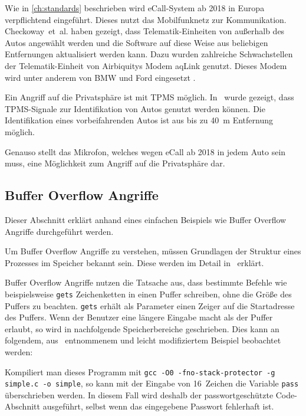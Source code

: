 Wie in \cref{ch:standards} beschrieben wird eCall-System ab 2018 in Europa
verpflichtend eingeführt. Dieses nutzt das Mobilfunknetz zur Kommunikation.
Checkoway~et~al. haben gezeigt, dass Telematik-Einheiten von außerhalb des
Autos angewählt werden und die Software auf diese Weise aus beliebigen
Entfernungen aktualisiert werden kann. Dazu wurden zahlreiche Schwachstellen
der Telematik-Einheit von Airbiquitys Modem aqLink genutzt. Dieses Modem wird
unter anderem von BMW und Ford eingesetzt \cite{AirbiquityBMW,AirbiquityFord}.

Ein Angriff auf die Privatsphäre ist mit TPMS möglich. In~\cite{Rouf2010} wurde
gezeigt, dass TPMS-Signale zur Identifikation von Autos genutzt werden können.
Die Identifikation eines vorbeifahrenden Autos ist aus bis zu \SI{40}{\meter}
Entfernung möglich.

Genauso stellt das Mikrofon, welches wegen eCall ab 2018 in jedem Auto sein
muss, eine Möglichkeit zum Angriff auf die Privatsphäre dar.


\subsection{Buffer Overflow Angriffe}\label{sec:Buffer-Overflow}
Dieser Abschnitt erklärt anhand eines einfachen Beispiels wie Buffer Overflow
Angriffe durchgeführt werden.

Um Buffer Overflow Angriffe zu verstehen, müssen Grundlagen der Struktur eines
Prozesses im Speicher bekannt sein. Diese werden im Detail
in~\cite{Silberschatz2005} erklärt.

Buffer Overflow Angriffe nutzen die Tatsache aus, dass bestimmte Befehle wie
beispielsweise \verb+gets+ Zeichenketten in einen Puffer schreiben, ohne die
Größe des Puffers zu beachten. \verb+gets+ erhält als Parameter einen Zeiger
auf die Startadresse des Puffers. Wenn der Benutzer eine längere Eingabe macht
als der Puffer erlaubt, so wird in nach\-folgende Speicher\-bereiche
geschrieben. Dies kann an folgendem, aus~\cite{Arora2013} entnommenem und
leicht modifiziertem Beispiel beobachtet werden:



Kompiliert man dieses Programm mit
\texttt{gcc -O0 -fno-stack-protector -g simple.c -o simple}, so kann mit der
Eingabe von 16~Zeichen die Variable \texttt{pass} überschrieben werden. In diesem
Fall wird deshalb der passwortgeschützte Code-Abschnitt ausgeführt, selbst
wenn das eingegebene Passwort fehlerhaft ist.

